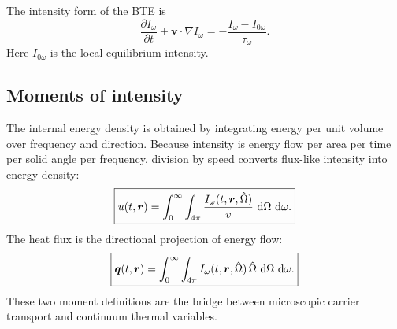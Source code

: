 \documentclass[11pt]{article}
\begin{document}
The intensity form of the BTE is
\begin{equation}
    \boxed{\frac{\partial I_\omega}{\partial t}+\bm{v}\cdot\nabla I_\omega
    =-\frac{I_\omega-I_{0\omega}}{\tau_\omega}.}
    \label{eq:intensity_bte}
\end{equation}
Here \(I_{0\omega}\) is the local-equilibrium intensity.

\subsection{Moments of intensity}
The internal energy density is obtained by integrating energy per unit volume over frequency and direction. Because intensity is energy flow per area per time per solid angle per frequency, division by speed converts flux-like intensity into energy density:
\begin{equation}
    \boxed{u(t,\bm{r})=\int_0^\infty\int_{4\pi}\frac{I_\omega(t,\bm{r},\hat{\Omega})}{v}\,\mathop{}\!\mathrm{d}\Omega\,\mathop{}\!\mathrm{d}\omega.}
    \label{eq:energy_moment}
\end{equation}
The heat flux is the directional projection of energy flow:
\begin{equation}
    \boxed{\bm{q}(t,\bm{r})=\int_0^\infty\int_{4\pi} I_\omega(t,\bm{r},\hat{\Omega})\,\hat{\Omega}\,\mathop{}\!\mathrm{d}\Omega\,\mathop{}\!\mathrm{d}\omega.}
    \label{eq:flux_moment}
\end{equation}
These two moment definitions are the bridge between microscopic carrier transport and continuum thermal variables.
\end{document}
